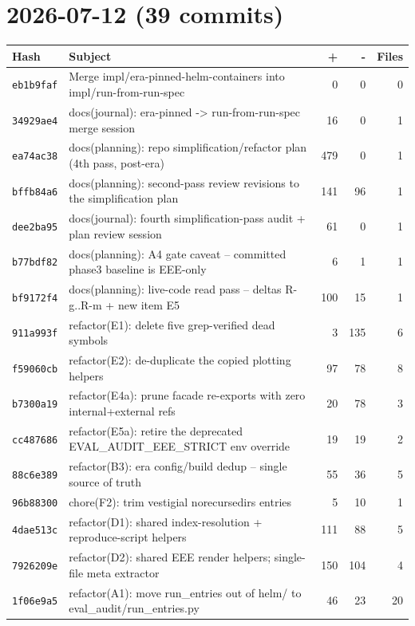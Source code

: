 \section*{2026-07-12 (39 commits)}
\begin{longtable}{@{}p{}p{}r r r@{}}
\toprule Hash & Subject & + & - & Files \\ \midrule\endhead
\texttt{eb1b9faf} & Merge impl/era-pinned-helm-containers into impl/run-from-run-spec & 0 & 0 & 0 \\
\texttt{34929ae4} & docs(journal): era-pinned -> run-from-run-spec merge session & 16 & 0 & 1 \\
\texttt{ea74ac38} & docs(planning): repo simplification/refactor plan (4th pass, post-era) & 479 & 0 & 1 \\
\texttt{bffb84a6} & docs(planning): second-pass review revisions to the simplification plan & 141 & 96 & 1 \\
\texttt{dee2ba95} & docs(journal): fourth simplification-pass audit + plan review session & 61 & 0 & 1 \\
\texttt{b77bdf82} & docs(planning): A4 gate caveat -- committed phase3 baseline is EEE-only & 6 & 1 & 1 \\
\texttt{bf9172f4} & docs(planning): live-code read pass -- deltas R-g..R-m + new item E5 & 100 & 15 & 1 \\
\texttt{911a993f} & refactor(E1): delete five grep-verified dead symbols & 3 & 135 & 6 \\
\texttt{f59060cb} & refactor(E2): de-duplicate the copied plotting helpers & 97 & 78 & 8 \\
\texttt{b7300a19} & refactor(E4a): prune facade re-exports with zero internal+external refs & 20 & 78 & 3 \\
\texttt{cc487686} & refactor(E5a): retire the deprecated EVAL\_AUDIT\_EEE\_STRICT env override & 19 & 19 & 2 \\
\texttt{88c6e389} & refactor(B3): era config/build dedup -- single source of truth & 55 & 36 & 5 \\
\texttt{96b88300} & chore(F2): trim vestigial norecursedirs entries & 5 & 10 & 1 \\
\texttt{4dae513c} & refactor(D1): shared index-resolution + reproduce-script helpers & 111 & 88 & 5 \\
\texttt{7926209e} & refactor(D2): shared EEE render helpers; single-file meta extractor & 150 & 104 & 4 \\
\texttt{1f06e9a5} & refactor(A1): move run\_entries out of helm/ to eval\_audit/run\_entries.py & 46 & 23 & 20 \\

\end{longtable}
